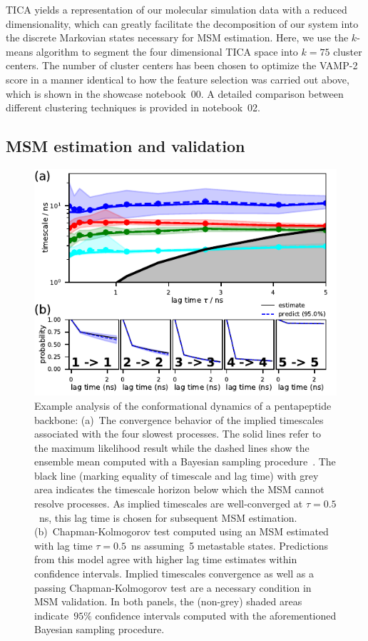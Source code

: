 \documentclass[9pt,tutorial]{livecoms}
\begin{document}
TICA yields a representation of our molecular simulation data with a reduced dimensionality,
which can greatly facilitate the decomposition of our system into the discrete Markovian states necessary for MSM estimation.
Here, we use the $k$-means algorithm to segment the four dimensional TICA space into $k=75$ cluster centers.
The number of cluster centers has been chosen to optimize the VAMP-2 score in a manner identical to how the feature selection was carried out above,
which is shown in the showcase notebook~00.
A detailed comparison between different clustering techniques is provided in notebook~02.

\subsection{MSM estimation and validation}

\begin{figure}
\includegraphics{figure_4}
\caption{Example analysis of the conformational dynamics of a pentapeptide backbone:
(a)~The convergence behavior of the implied timescales associated with the four slowest processes.
The solid lines refer to the maximum likelihood result while the dashed lines show the ensemble mean computed with a Bayesian sampling procedure~\cite{ben-rev-msm}.
The black line (marking equality of timescale and lag time) with grey area indicates the timescale horizon below which the MSM cannot resolve processes.
As implied timescales are well-converged at $\tau=0.5$~ns, this lag time is chosen for subsequent MSM estimation.
(b)~Chapman-Kolmogorov test computed using an MSM estimated with lag time $\tau=0.5$~ns assuming~5 metastable states.
Predictions from this model agree with higher lag time estimates within confidence intervals.
Implied timescales convergence as well as a passing Chapman-Kolmogorov test are a necessary condition in MSM validation.
In both panels, the (non-grey) shaded areas indicate~$95\%$ confidence intervals computed with the aforementioned Bayesian sampling procedure.}
\label{fig:its-and-ck}
\end{figure}
\end{document}
